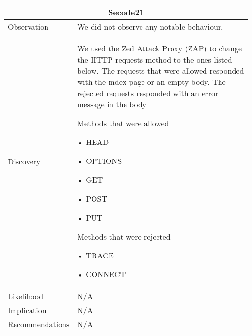 \documentclass[headsepline,footsepline,footinclude=false,oneside,fontsize=11pt,paper=a4,listof=totoc,bibliography=totoc]{scrbook} %
\begin{document}
\begin{tabular}{ p{3cm}|p{13cm}  }
	\hline
	\multicolumn{2}{c}{Secode21} \\ 
	\hline
	Observation   &  We did not observe any notable behaviour.  \\
	
	Discovery  &   We used the Zed  Attack  Proxy  (ZAP)	to change the HTTP requests method
	to the ones listed below. The requests that were allowed responded
	with the index page or an empty body. The rejected requests responded with an
	error message in the body \
	
	Methods that were allowed\
	
	•	HEAD\
	
	•	OPTIONS\
	
	•	GET\
	
	•	POST\
	
	•	PUT  \
	
	Methods that were rejected\
	
	•	TRACE\
	
	•	CONNECT  \\
	
	
	Likelihood & N/A \\
	Implication    & N/A \\
	Recommendations& N/A \\ 
	
	\hline
\end{tabular}
\newline
\vspace{0.5cm}
\newline
\end{document}
